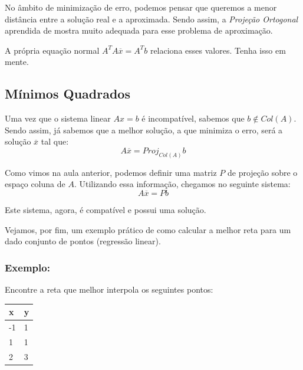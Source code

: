 \documentclass[12pt]{article}
\begin{document}
No âmbito de minimização de erro, podemos pensar que queremos a menor distância entre a solução real e a aproximada. Sendo assim, a \textit{Projeção Ortogonal} aprendida de mostra muito adequada para esse problema de aproximação.

A própria equação normal $A^TA\overline{x}=A^Tb$ relaciona esses valores. Tenha isso em mente.

\subsection{Mínimos Quadrados}

Uma vez que o sistema linear $Ax=b$ é incompatível, sabemos que $b \notin Col(A)$. Sendo assim, já sabemos que a melhor solução, a que minimiza o erro, será a solução $\overline{x}$ tal que:
\begin{equation*}
	A\overline{x}=Proj_{Col(A)}b
\end{equation*}

Como vimos na aula anterior, podemos definir uma matriz $P$ de projeção sobre o espaço coluna de $A$. Utilizando essa informação, chegamos no seguinte sistema:
\begin{equation*}
	A\overline{x}=Pb
\end{equation*}

Este sistema, agora, é compatível e possui uma solução.

Vejamos, por fim, um exemplo prático de como calcular a melhor reta para um dado conjunto de pontos (regressão linear).

\subsubsection{Exemplo:}
Encontre a reta que melhor interpola os seguintes pontos:
\begin{table}[]
	\centering
	\begin{tabular}{|l|l|}
		\hline
		x  & y \\ \hline
		-1 & 1 \\ \hline
		1  & 1 \\ \hline
		2  & 3 \\ \hline
	\end{tabular}
\end{table}
\end{document}
